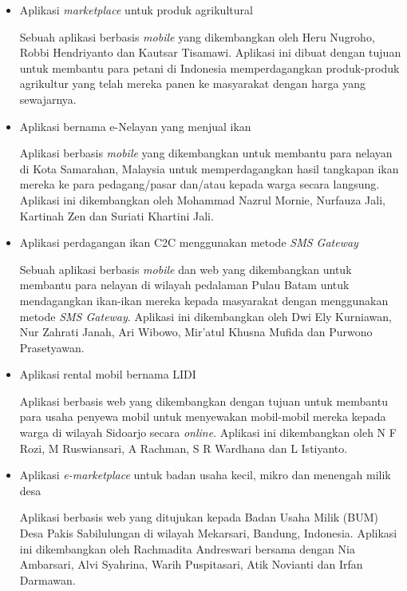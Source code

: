 \documentclass[a4paper]{article}
\begin{document}
\begin{itemize}
    \item Aplikasi \textit{marketplace} untuk produk agrikultural
    
    Sebuah aplikasi berbasis \textit{mobile} yang dikembangkan oleh Heru Nugroho, Robbi Hendriyanto dan Kautsar Tisamawi. Aplikasi ini dibuat dengan tujuan untuk membantu para petani di Indonesia memperdagangkan produk-produk agrikultur yang telah mereka panen ke masyarakat dengan harga yang sewajarnya\autocite{agriculture-marketplace}. 

    \item Aplikasi bernama e-Nelayan yang menjual ikan
    
    Aplikasi berbasis \textit{mobile} yang dikembangkan untuk membantu para nelayan di Kota Samarahan, Malaysia untuk memperdagangkan hasil tangkapan ikan mereka ke para pedagang/pasar dan/atau kepada warga secara langsung. Aplikasi ini dikembangkan oleh Mohammad Nazrul Mornie, Nurfauza Jali, Kartinah Zen dan Suriati Khartini Jali\autocite{fishes-marketplace}.

    \item Aplikasi perdagangan ikan C2C menggunakan metode \textit{SMS Gateway}
    
    Sebuah aplikasi berbasis \textit{mobile} dan web yang dikembangkan untuk membantu para nelayan di wilayah pedalaman Pulau Batam untuk mendagangkan ikan-ikan mereka kepada masyarakat dengan menggunakan metode \textit{SMS Gateway}. Aplikasi ini dikembangkan oleh Dwi Ely Kurniawan, Nur Zahrati Janah, Ari Wibowo, Mir'atul Khusna Mufida dan Purwono Prasetyawan\autocite{c2c-fish-marketplace}.

    \item Aplikasi rental mobil bernama LIDI
    
    Aplikasi berbasis web yang dikembangkan dengan tujuan untuk membantu para usaha penyewa mobil untuk menyewakan mobil-mobil mereka kepada warga di wilayah Sidoarjo secara \textit{online}. Aplikasi ini dikembangkan oleh N F Rozi, M Ruswiansari, A Rachman, S R Wardhana dan L Istiyanto\autocite{lidi-car-rental}. 

    \item Aplikasi \textit{e-marketplace} untuk badan usaha kecil, mikro dan menengah milik desa
    
    Aplikasi berbasis web yang ditujukan kepada Badan Usaha Milik (BUM) Desa Pakis Sabilulungan di wilayah Mekarsari, Bandung, Indonesia. Aplikasi ini dikembangkan oleh Rachmadita Andreswari bersama dengan Nia Ambarsari, Alvi Syahrina, Warih Puspitasari, Atik Novianti dan Irfan Darmawan\autocite{bum-mekarsari}.

\end{itemize}
\end{document}

